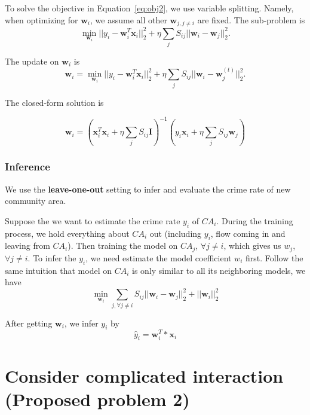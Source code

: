 To solve the objective in Equation~\ref{eq:obj2}, we use variable splitting. Namely, when optimizing for $\mathbf{w}_i$, we assume all other $\mathbf{w}_{j, j\neq i}$ are fixed. The sub-problem is
\begin{equation}
\label{eq:subobj}
\min_{\mathbf{w}_i}   ||y_i - \mathbf{w}_i^T \mathbf{x}_i ||_2^2 + \eta \sum_j S_{ij}|| \mathbf{w}_i - \mathbf{w}_j||_2^2.
\end{equation}



The update on $\mathbf{w}_i$ is
\[
\mathbf{w}_i = \min_{\mathbf{w}_i}   ||y_i - \mathbf{w}_i^T \mathbf{x}_i ||_2^2 + \eta \sum_j S_{ij} || \mathbf{w}_i - \mathbf{w}_j^{(t)} ||_2^2.
\]

The closed-form solution is

\begin{equation}
\mathbf{w}_i = (\mathbf{x}_i^T \mathbf{x}_i + \eta \sum_j S_{ij} \mathbf{I} )^{-1} (y_i \mathbf{x}_i + \eta \sum_j S_{ij} \mathbf{w}_j) 
\end{equation}


\subsubsection{Inference}

We use the \textbf{leave-one-out} setting to infer and evaluate the crime rate of new community area. 

Suppose the we want to estimate the crime rate $y_i$ of $CA_i$. During the training process, we hold everything about $CA_i$ out (including $y_i$, flow coming in and leaving from $CA_i$). Then training the model on $CA_j$, $\forall j \neq i$, which gives us $w_j$, $\forall j \neq i$. To infer the $y_i$, we need estimate the model coefficient $w_i$ first. Follow the same intuition that model on $CA_i$ is only similar to all its neighboring models, we have
\begin{equation}
\min_{\mathbf{w}_i} \sum_{j, \forall j \neq i} S_{ij} || \mathbf{w}_i - \mathbf{w}_j ||_2^2 + || \mathbf{w}_i ||_2^2
\end{equation}

After getting $\mathbf{w}_i$, we infer $y_i$ by
\begin{equation}
\hat{y}_i = \mathbf{w}_i^T * \mathbf{x}_i
\end{equation}



\section{Consider complicated interaction (Proposed problem 2)}


